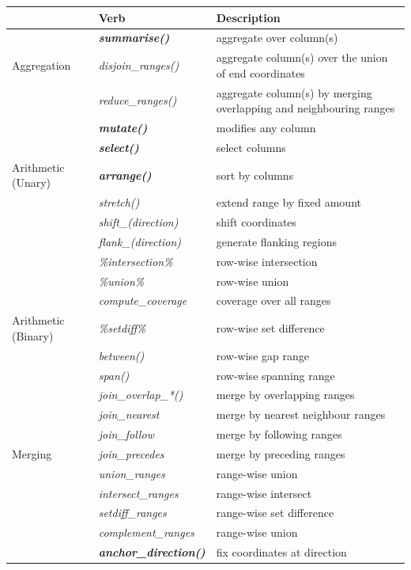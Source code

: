 \documentclass[10pt,letterpaper]{article}
\begin{document}
\begin{table}[!htbp]
\centering
\begin{tabular}{|l|l|p{4cm}|}
  \hline
  & Verb &  Description \\ 
  \hline
   & \textbf{\emph{summarise()}} & aggregate over column(s) \\ 
   Aggregation & \emph{disjoin\_ranges()} & aggregate column(s) over the union of end coordinates \\
   &  \emph{reduce\_ranges()} & aggregate column(s) by merging overlapping and neighbouring ranges \\
   \hline
   &  \textbf{\emph{mutate()}} & modifies any column \\
   & \textbf{\emph{select()}} & select columns \\
  Arithmetic (Unary) & \textbf{\emph{arrange()}} & sort by columns \\
   & \emph{stretch()} & extend range by fixed amount \\
   &  \emph{shift\_(direction)} & shift coordinates \\
   & \emph{flank\_(direction)} & generate flanking regions \\
   & \emph{\%intersection\% } & row-wise intersection \\
   & \emph{\%union\%} & row-wise union \\
   & \emph{compute\_coverage} & coverage over all ranges \\
  Arithmetic (Binary) &  \emph{\%setdiff\%} & row-wise set difference \\
   & \emph{between()} & row-wise gap range \\
   & \emph{span()} & row-wise spanning range \\
   \hline
    & \emph{join\_overlap\_*()} & merge by overlapping ranges \\
    & \emph{join\_nearest} & merge by nearest neighbour ranges \\
    & \emph{join\_follow} & merge by following ranges \\
    Merging & \emph{join\_precedes} & merge by preceding ranges \\
    & \emph{union\_ranges} & range-wise union \\
    & \emph{intersect\_ranges} & range-wise intersect \\
    & \emph{setdiff\_ranges} & range-wise set difference \\
    & \emph{complement\_ranges} & range-wise union \\
  \hline
   & \textbf{\emph{anchor\_direction()}} & fix coordinates at direction \\

\end{tabular}
\end{table}
\end{document}

